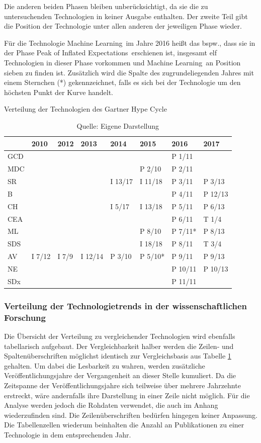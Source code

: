 Die anderen beiden Phasen bleiben unberücksichtigt, da sie die zu untersuchenden Technologien in keiner Ausgabe enthalten. Der zweite Teil gibt die Position der Technologie unter allen anderen der jeweiligen Phase wieder.

Für die Technologie \glqq Machine Learning\grqq~im Jahre 2016 heißt das bspw., dass sie in der Phase \glqq Peak of Inflated Expectations\grqq~erschienen ist, insgesamt elf Technologien in dieser Phase vorkommen und \glqq Machine Learning\grqq~an Position sieben zu finden ist. Zusätzlich wird die Spalte des zugrundeliegenden Jahres mit einem Sternchen (*) gekennzeichnet, falls es sich bei der Technologie um den höchsten Punkt der Kurve handelt.

\begin{table}
	\caption{Verteilung der Technologien des \glqq Gartner Hype Cycle\grqq}
	\centering
	\label{tab:dist_ghc}
\begin{tabularx}{\linewidth}{X|XXXXXXX}
	& 2010 & 2012 & 2013 & 2014 & 2015 & 2016 & 2017 \\
	\hline
	GCD &  &  &  &  &  & P 1/11 &  \\
	\hline
	MDC &  &  &  &  & P 2/10 & P 2/11 &  \\
	\hline
	SR &  &  &  & I 13/17 & I 11/18 & P 3/11 & P 3/13 \\
	\hline
	B &  &  &  &  &  & P 4/11 & P 12/13 \\
	\hline
	CH &  &  &  & I 5/17 & I 13/18 & P 5/11 & P 6/13 \\
	\hline
	CEA &  &  &  &  &  & P 6/11 & T 1/4 \\
	\hline
	ML &  &  &  &  & P 8/10 & P 7/11* & P 8/13 \\
	\hline
	SDS &  &  &  &  & I 18/18 & P 8/11 & T 3/4 \\
	\hline
	AV & I 7/12 & I 7/9 & I 12/14 & P 3/10 & P 5/10* & P 9/11 & P 9/13 \\
	\hline
	NE &  &  &  &  &  & P 10/11 & P 10/13 \\
	\hline
	SDx &  &  &  &  &  & P 11/11 &  \\
\end{tabularx}
\caption*{Quelle: Eigene Darstellung}
\end{table}

\subsubsection{Verteilung der Technologietrends in der wissenschaftlichen Forschung}
Die Übersicht der Verteilung zu vergleichender Technologien wird ebenfalls tabellarisch aufgebaut. Der Vergleichbarkeit halber werden die Zeilen- und Spaltenüberschriften möglichst identisch zur Vergleichsbasis aus Tabelle \ref{tab:dist_ghc} gehalten. Um dabei die Lesbarkeit zu wahren, werden zusätzliche Veröffentlichungsjahre der Vergangenheit an dieser Stelle kumuliert. Da die Zeitspanne der Veröffentlichungsjahre sich teilweise über mehrere Jahrzehnte erstreckt, wäre andernfalls ihre Darstellung in einer Zeile nicht möglich. Für die Analyse werden jedoch die Rohdaten verwendet, die auch im Anhang wiederzufinden sind. Die Zeilenüberschriften bedürfen hingegen keiner Anpassung. Die Tabellenzellen wiederum beinhalten die Anzahl an Publikationen zu einer Technologie in dem entsprechenden Jahr.

